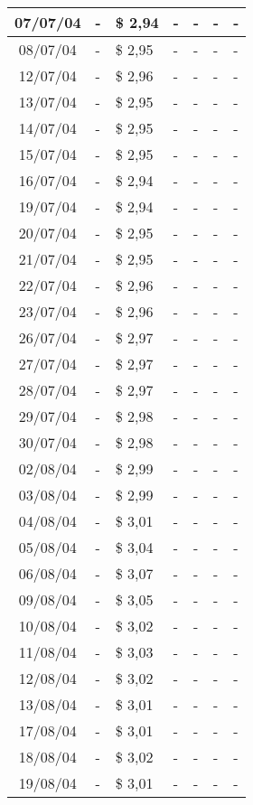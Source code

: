 \begin{center}
\begin{longtable}{|c|p{1.5cm}|p{1.5cm}|p{1.5cm}|p{1.5cm}|p{1.5cm}|p{1.5cm}|}
07/07/04 & - & \$ 2,94 & - & - & - & - \\ \hline
08/07/04 & - & \$ 2,95 & - & - & - & - \\ \hline
12/07/04 & - & \$ 2,96 & - & - & - & - \\ \hline
13/07/04 & - & \$ 2,95 & - & - & - & - \\ \hline
14/07/04 & - & \$ 2,95 & - & - & - & - \\ \hline
15/07/04 & - & \$ 2,95 & - & - & - & - \\ \hline
16/07/04 & - & \$ 2,94 & - & - & - & - \\ \hline
19/07/04 & - & \$ 2,94 & - & - & - & - \\ \hline
20/07/04 & - & \$ 2,95 & - & - & - & - \\ \hline
21/07/04 & - & \$ 2,95 & - & - & - & - \\ \hline
22/07/04 & - & \$ 2,96 & - & - & - & - \\ \hline
23/07/04 & - & \$ 2,96 & - & - & - & - \\ \hline
26/07/04 & - & \$ 2,97 & - & - & - & - \\ \hline
27/07/04 & - & \$ 2,97 & - & - & - & - \\ \hline
28/07/04 & - & \$ 2,97 & - & - & - & - \\ \hline
29/07/04 & - & \$ 2,98 & - & - & - & - \\ \hline
30/07/04 & - & \$ 2,98 & - & - & - & - \\ \hline
02/08/04 & - & \$ 2,99 & - & - & - & - \\ \hline
03/08/04 & - & \$ 2,99 & - & - & - & - \\ \hline
04/08/04 & - & \$ 3,01 & - & - & - & - \\ \hline
05/08/04 & - & \$ 3,04 & - & - & - & - \\ \hline
06/08/04 & - & \$ 3,07 & - & - & - & - \\ \hline
09/08/04 & - & \$ 3,05 & - & - & - & - \\ \hline
10/08/04 & - & \$ 3,02 & - & - & - & - \\ \hline
11/08/04 & - & \$ 3,03 & - & - & - & - \\ \hline
12/08/04 & - & \$ 3,02 & - & - & - & - \\ \hline
13/08/04 & - & \$ 3,01 & - & - & - & - \\ \hline
17/08/04 & - & \$ 3,01 & - & - & - & - \\ \hline
18/08/04 & - & \$ 3,02 & - & - & - & - \\ \hline
19/08/04 & - & \$ 3,01 & - & - & - & - \\ \hline

\end{longtable}
\end{center}
